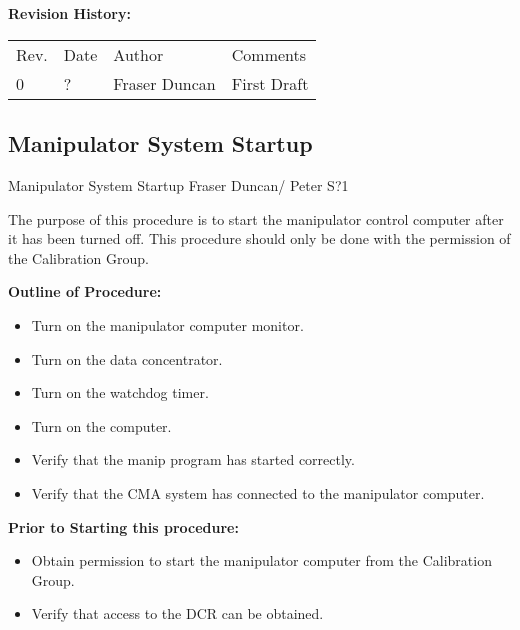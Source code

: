 {\small
~\\
~\\
\noindent
{\bf Revision History:}\\
\begin{tabular}{llll}
Rev. & Date & Author & Comments\\

0             & 
?    & 
Fraser Duncan &
\parbox[t]{3.0in}{
  First Draft
}
\end{tabular}
}






\newpage
\subsection{Manipulator System Startup}

             {Manipulator System Startup}
             {Fraser Duncan/ Peter S}{?}{1}

  
  The purpose of this procedure is to start the manipulator control computer
after it has been turned off.  This procedure should only be done with
the permission of the Calibration Group.
    
\noindent
{\bf Outline of Procedure:}
\begin{itemize}  
\item Turn on the manipulator computer monitor.
  
\item Turn on the data concentrator.
  
\item Turn on the watchdog timer.
  
\item Turn on the computer.
  
\item Verify that the manip program has started correctly.
  
\item Verify that the CMA system has connected to the manipulator
    computer. 
\end{itemize}  
  
\noindent
{\bf Prior to Starting this procedure:}
\begin{itemize}   
\item Obtain permission to start the manipulator computer from 
    the Calibration Group.
  
\item Verify that access to the DCR can be obtained.
\end{itemize}
  

